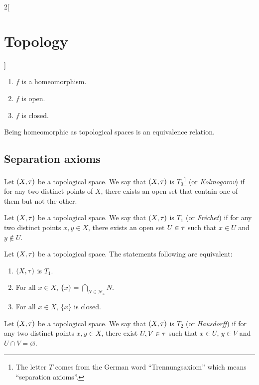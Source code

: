 \documentclass[../../../main.tex]{subfiles}
\begin{document}
\begin{multicols}{2}[\section{Topology}]
\begin{prop}
        \begin{enumerate}
            \item $f$ is a homeomorphism.
            \item $f$ is open.
            \item $f$ is closed.
        \end{enumerate}
    \end{prop}
    \begin{prop}
        Being homeomorphic as topological spaces is an equivalence relation.
    \end{prop}
    \subsection{Separation axioms}
    \begin{definition}[$T_0$ space]
        Let $(X,\tau)$ be a topological space. We say that $(X,\tau)$ is $T_0$\footnote{The letter $T$ comes from the German word ``Trennungsaxiom'' which means ``separation axioms''.} (or \emph{Kolmogorov}) if for any two distinct points of $X$, there exists an open set that contain one of them but not the other.
    \end{definition}
    \begin{definition}[$T_1$ space]
        Let $(X,\tau)$ be a topological space. We say that $(X,\tau)$ is $T_1$ (or \emph{Fréchet}) if for any two distinct points $x,y\in X$, there exists an open set $U\in\tau$ such that $x\in U$ and $y\notin U$.
    \end{definition}
    \begin{theorem}
        Let $(X,\tau)$ be a topological space. The statements following are equivalent:
        \begin{enumerate}
            \item $(X,\tau)$ is $T_1$.
            \item For all $x\in X$, $\{x\}=\bigcap_{N\in \mathcal{N}_x}N$.
            \item For all $x\in X$, $\{x\}$ is closed.
        \end{enumerate}
    \end{theorem}
    \begin{definition}[$T_2$ space]
        Let $(X,\tau)$ be a topological space. We say that $(X,\tau)$ is $T_2$ (or \emph{Hausdorff}) if for any two distinct points $x,y\in X$, there exist $U,V\in\tau$ such that $x\in U$, $y\in V$ and $U\cap V=\varnothing$.
    \end{definition}
    \begin{theorem}

\end{theorem}
\end{multicols}
\end{document}
